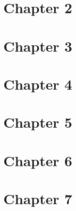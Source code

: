\documentclass[8pt]{extarticle}
\begin{document}
\begin{multicols*}{4}
\setcounter{section}{1}
\section{Chapter 2}

\section{Chapter 3}

\section{Chapter 4}

\section{Chapter 5}

\section{Chapter 6}

\section{Chapter 7}

\end{multicols*}
\end{document}
